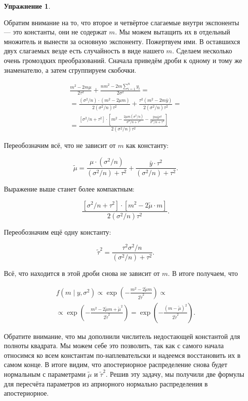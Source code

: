 \documentclass[12pt, a4paper, oneside]{extreport}
\newcommand{\expp}[1]{ \exp \left( #1 \right)}
\theoremstyle{plain}              %
\theoremstyle{definition}         %
\newtheorem{problem}{\color{myblue} Упражнение}
\begin{document}
\begin{problem}
\begin{sol}
Обратим внимание на то, что второе и четвёртое слагаемые внутри экспоненты --- это константы, они не содержат $m$. Мы можем вытащить их в отдельный множитель и вынести за основную экспоненту. Пожертвуем ими. В оставшихся двух слагаемых везде есть случайность в виде нашего $m$. Сделаем несколько очень громоздких преобразований. Сначала приведём дроби к одному и тому же знаменателю, а затем сгруппируем скобочки.

\begin{multline*}
\frac{m^2 - 2m \mu}{2 \tau^2} + \frac{n m^2 - 2m \sum_{i=1}^n y_i}{2\sigma^2} = \\ = \frac{(\sigma^2/n) \cdot (m^2 - 2 \mu m)}{2 (\sigma^2/n) \tau^2} + \frac{\tau^2(m^2 - 2m \bar y)}{2 (\sigma^2/n) \tau^2} = \\ =  \frac{ [\sigma^2/n + \tau^2] \cdot \left[ m^2 - \frac{2\mu m(\sigma^2/n)}{\sigma^2/n+\tau^2} - \frac{2m\bar y \tau^2}{\sigma^2/n + \tau^2} \right]}{2 (\sigma^2/n) \tau^2}
\end{multline*}

Переобозначим всё, что не зависит от $m$ как константу:

\[\tilde \mu = \frac{\mu \cdot (\sigma^2/n)}{(\sigma^2/n) + \tau^2} + \frac{\bar y \cdot \tau^2}{(\sigma^2/n) + \tau^2}.\] 

Выражение выше станет более компактным:

\[ \frac{[\sigma^2/n + \tau^2] \cdot [m^2 - 2\tilde \mu \cdot m]}{2 (\sigma^2/n)\tau^2}.\]

Переобозначим ещё одну константу:


\[ \tilde \tau^2 = \frac{\tau^2 \sigma^2/n}{(\sigma^2/n) + \tau^2}.\]
 
 Всё, что находится в этой дроби снова не зависит от $m$. В итоге получаем, что

\begin{multline*} 
f(m \mid y, \sigma^2) \propto \expp{-\frac{m^2 - 2 \tilde \mu m}{2 \tilde \tau^2}} \propto  \\ \propto \expp{-\frac{m^2 - 2 \tilde \mu m + \tilde \mu^2}{2 \tilde \tau^2}} = \expp{-\frac{(m - \tilde \mu)^2}{2 \tilde \tau^2}}.
\end{multline*}

Обратите внимание, что мы дополнили числитель недостающей константой для полноты квадрата.  Мы можем себе это позволить, так как с самого начала относимся ко всем константам по-наплевательски и надеемся восстановить их в самом конце.  В итоге видим, что апостериорное распределение снова будет нормальным с параметрами $\tilde \mu$ и $\tilde \tau^2$. Решив эту задачу, мы получили две формулы для пересчёта параметров из априорного нормально распределения в апостериорное. 
\end{sol}
\end{problem}
\end{document}
